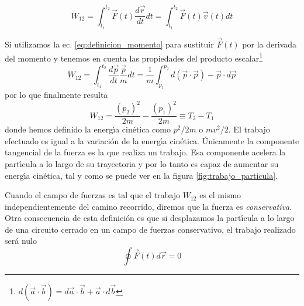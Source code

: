 \begin{equation}
W_{12}=\int_{t_1}^{t_2} \vec{F}(t)\frac{d\vec{r}}{dt}dt=\int_{t_1}^{t_2} \vec{F}(t)\vec{v}(t)dt
\label{eq:definicion_trabajo_2}
\end{equation}

Si utilizamos la ec. \ref{eq:definicion_momento} para sustituir $\vec{F}(t)$ por la derivada del momento y tenemos en cuenta las propiedades del producto escalar\footnote{$d(\vec{a}\cdot \vec{b})=d\vec{a}\cdot \vec{b}+\vec{a}\cdot d\vec{b}$}
\begin{equation}
W_{12}=\int_{t_1}^{t_2} \frac{d\vec{p}}{dt}\frac{\vec{p}}{m}dt=\frac{1}{m}\int_{p_1}^{p_2}d(\vec{p}\cdot \vec{p})-\vec{p}\cdot d \vec{p}
\label{eq:definicion_trabajo_2}
\end{equation}
por lo que finalmente resulta
\begin{equation}
W_{12}=\frac{(p_2)^2}{2m}-\frac{(p_1)^2}{2m}\equiv T_2-T_1
\label{eq:definicion_energia_cinetica}
\end{equation}
donde hemos definido la energ\'\i{}a cin\'etica como $p^2/2m$ o $mv^2/2$. El trabajo efectuado  es igual a la variaci\'on de la energ\'\i{}a cin\'etica. \'Unicamente la componente tangencial de la fuerza  es la que realiza un trabajo. Esa componente acelera la part\'\i{}cula a lo largo de su trayectoria y por lo tanto es capaz de aumentar su energ\'\i{}a cin\'etica, tal y como se puede ver en la figura \ref{fig:trabajo_particula}.

Cuando el campo de fuerzas es tal que el trabajo $W_{12}$ es el mismo independientemente del camino recorrido, diremos que la fuerza es \emph{conservativa}. Otra consecuencia de esta definici\'on es que si desplazamos la part\'\i{}cula a lo largo de una circuito cerrado en un campo de fuerzas conservativo, el trabajo realizado ser\'a nulo
\begin{equation}
\oint \vec{F}(t)d\vec{r}=0
\label{eq:trabajo_cerrado}
\end{equation}




